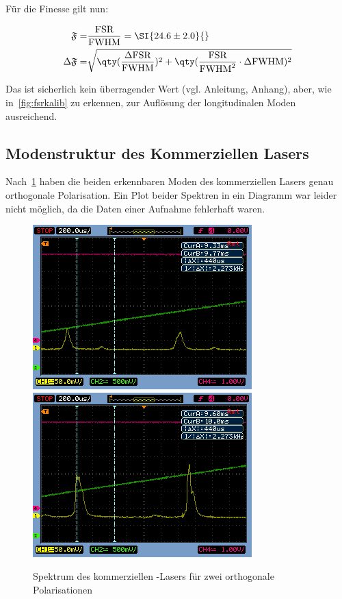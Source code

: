\documentclass[slug=GL, room=HZDR\ Dresden/Rossendorf\,\ Geb.\ 620/123, supervisor=Tim\ Ziegler]{../../Lab_Report_LaTeX/lab_report}
\newcommand{\hne}{\ce{HeNe}-Laser}
\begin{document}
F\"ur die Finesse gilt nun:

\begin{align}
  \label{eq:finesselaser}
  \mathfrak{F} =& \frac{\text{FSR}}{\text{FWHM}}=\SI{24.6\pm 2.0}{} \\
  \Delta\mathfrak{F} =&
  \sqrt{\qty(\frac{\Delta\text{FSR}}{\text{FWHM}})^2 + \qty(\frac{\text{FSR}}{\text{FWHM}^2}\cdot\Delta\text{FWHM})^2}
\end{align}

Das ist sicherlich kein überragender Wert (vgl. Anleitung, Anhang),
aber, wie in~\ref{fig:fsrkalib} zu erkennen, zur Aufl\"osung der
longitudinalen Moden ausreichend.

\subsection{Modenstruktur des Kommerziellen Lasers}
\label{sec:modkomm}
Nach~\ref{fig:polarisations} haben die beiden erkennbaren Moden des
kommerziellen Lasers genau orthogonale Polarisation. Ein Plot beider
Spektren in ein Diagramm war leider nicht m\"oglich, da die Daten einer
Aufnahme fehlerhaft waren.


\label{sec:modsturkom}
\begin{figure}[b]\centering
  \includegraphics[width=.3\columnwidth]{pol1.png}
  \includegraphics[width=.3\columnwidth]{pol2.png}
  \caption[Gauss]{Spektrum des kommerziellen \hne{}s f\"ur zwei
    orthogonale Polarisationen}
  \label{fig:polarisations}
\end{figure}
\end{document}

